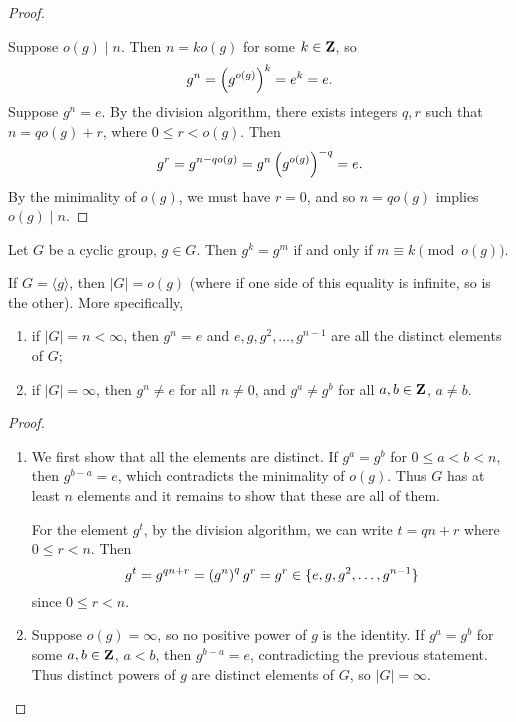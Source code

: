 \begin{proof} \

\fbox{$\impliedby$} Suppose $o(g)\mid n$. Then $n=ko(g)$ for some $k\in\mathbf Z$, so
\[g^n=\left(g^{o(g)}\right)^k=e^k=e.\]
\fbox{$\implies$} Suppose $g^n=e$. By the division algorithm, there exists integers $q,r$ such that $n=qo(g)+r$, where $0\le r<o(g)$. Then
\[g^r=g^{n-qo(g)}=g^n\left(g^{o(g)}\right)^{-q}=e.\]
By the minimality of $o(g)$, we must have $r=0$, and so $n=qo(g)$ implies $o(g)\mid n$.
\end{proof}

\begin{corollary}
Let $G$ be a cyclic group, $g\in G$. Then $g^k=g^m$ if and only if $m\equiv k\pmod{o(g)}$.
\end{corollary}

\begin{proposition}
If $G=\langle g\rangle$, then $|G|=o(g)$ (where if one side of this equality is infinite, so is the other). More specifically,
\begin{enumerate}[label=(\roman*)]
\item if $|G|=n<\infty$, then $g^n=e$ and $e,g,g^2,\dots,g^{n-1}$ are all the distinct elements of $G$;
\item if $|G|=\infty$, then $g^n\neq e$ for all $n\neq0$, and $g^a\neq g^b$ for all $a,b\in\mathbf Z$, $a\neq b$.
\end{enumerate}
\end{proposition}

\begin{proof} \
\begin{enumerate}[label=(\roman*)]
\item We first show that all the elements are distinct. If $g^a=g^b$ for $0\le a<b<n$, then $g^{b-a}=e$, which contradicts the minimality of $o(g)$. Thus $G$ has at least $n$ elements and it remains to show that these are all of them.

For the element $g^t$, by the division algorithm, we can write $t=qn+r$ where $0\le r<n$. Then
\[g^t=g^{qn+r}=\left(g^n\right)^q g^r=g^r\in\{e,g,g^2,\dots,g^{n-1}\}\]
since $0\le r<n$.

\item Suppose $o(g)=\infty$, so no positive power of $g$ is the identity. If $g^a=g^b$ for some $a,b\in\mathbf Z$, $a<b$, then $g^{b-a}=e$, contradicting the previous statement. Thus distinct powers of $g$ are distinct elements of $G$, so $|G|=\infty$.
\end{enumerate}
\end{proof}

